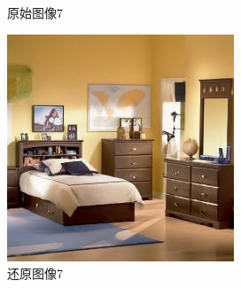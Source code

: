 \begin{figure}[H]
\begin{minipage}[b]{0.3\linewidth}
    \caption{原始图像7}
    \label{original image 7 }
  \end{minipage}
\hspace{0.1cm}
  \begin{minipage}[b]{0.3\linewidth}
    \includegraphics[width=\linewidth]{Picture/recon/00009.png}
    \caption{还原图像7}
    \label{inpainted image 7}
  \end{minipage}
  \label{整块损坏图像}
\end{figure}



